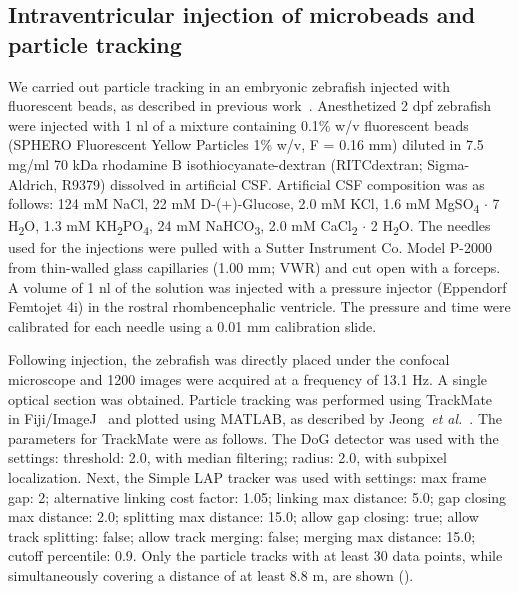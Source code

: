 \documentclass{WileyMSP-template}
\begin{document}
\subsection{Intraventricular injection of microbeads and particle tracking}
We carried out particle tracking in an embryonic zebrafish injected with fluorescent beads,
as described in previous work~\cite{Olstad2019CiliaryDevelopment}.
Anesthetized 2 dpf zebrafish were injected with 1 nl of a mixture containing 0.1\% w/v fluorescent beads
(SPHERO Fluorescent Yellow Particles 1\% w/v, F = 0.16 mm) diluted
in 7.5 mg/ml 70 kDa rhodamine B isothiocyanate-dextran (RITCdextran; Sigma-Aldrich, R9379)
dissolved in artificial CSF. Artificial CSF composition was as follows:
124 mM NaCl, 22 mM D-(+)-Glucose, 2.0 mM KCl, 1.6 mM MgSO\textsubscript{4} $\cdot$ 7 H\textsubscript{2}O,
1.3 mM KH\textsubscript{2}PO\textsubscript{4}, 24 mM NaHCO\textsubscript{3},
2.0 mM CaCl\textsubscript{2} $\cdot$ 2 H\textsubscript{2}O.
The needles used for the injections were pulled with a
Sutter Instrument Co. Model P-2000 from thin-walled glass
capillaries (1.00 mm; VWR) and cut open with a forceps.
A volume of 1 nl of the solution was injected with a pressure injector
(Eppendorf Femtojet 4i) in the rostral rhombencephalic ventricle.
The pressure and time were calibrated for each needle using a 0.01 mm calibration slide.

Following injection, the zebrafish was directly placed under the confocal
microscope and 1200 images were acquired at a frequency of 13.1 Hz.
A single optical section was obtained. Particle tracking was performed using
TrackMate~\cite{Tinevez2017TrackMate:Tracking} in Fiji/ImageJ~\cite{Schindelin2012Fiji:Analysis}
and plotted using MATLAB, as described by Jeong~\emph{et al.}~\cite{Jeong2022MeasurementTelencephalon}.
The parameters for TrackMate were as follows.
The DoG detector was used with the settings: threshold: 2.0, with
median filtering; radius: 2.0, with subpixel localization.
Next, the Simple LAP tracker was used with settings: max frame gap: 2;
alternative linking cost factor: 1.05; linking max distance: 5.0; gap closing max distance: 2.0;
splitting max distance: 15.0; allow gap closing: true; allow track splitting:
false; allow track merging: false; merging max distance: 15.0; cutoff percentile: 0.9.
Only the particle tracks with at least 30 data points, while simultaneously
covering a distance of at least 8.8 \textmu m, are shown ().
\end{document}
